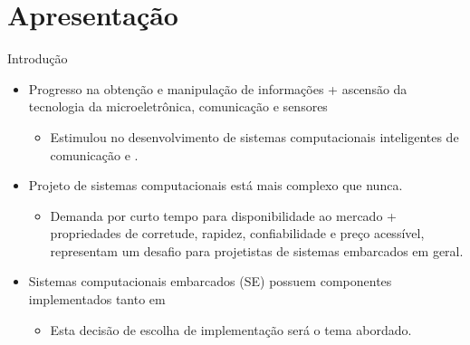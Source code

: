 \section{Apresentação}

      \begin{frame}{Introdução}
         \begin{itemize}
            \setlength{\itemsep}{1.3em}
            \item Progresso na obtenção e manipulação de informações + ascensão da tecnologia da microeletrônica, comunicação e sensores \cite{Jozwiak2017}
            \begin{itemize}
               \item Estimulou no desenvolvimento de sistemas computacionais inteligentes de comunicação e \wearables.
            \end{itemize}
            
            \item Projeto de sistemas computacionais está mais complexo que nunca.
            \begin{itemize}
               \item Demanda por curto tempo para disponibilidade ao mercado + propriedades de corretude, rapidez, confiabilidade e preço acessível, representam um desafio para projetistas de sistemas embarcados em geral.
            \end{itemize}                        
            
            \item Sistemas computacionais embarcados (SE) possuem componentes implementados tanto em \hs
            \begin{itemize}
               \item Esta decisão de escolha de implementação será o tema abordado.
            \end{itemize}
            
         \end{itemize}
      \end{frame}
      
